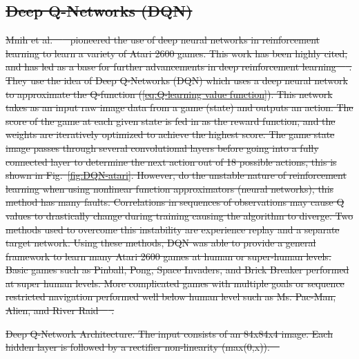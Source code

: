 \documentclass[12pt,american]{report}
\providecommand{\DIFdeltex}[1]{{\protect\color{red}\sout{#1}}}                      %
\providecommand{\DIFdelFL}[1]{\DIFdel{#1}} %
\providecommand{\DIFdel}[1]{\texorpdfstring{\DIFdeltex{#1}}{}} %
\begin{document}
\subsection{\DIFdel{Deep Q-Networks (DQN)}}
\addtocounter{subsection}{-1}%
\DIFdel{Mnih et al.~\mbox{%
\cite{atari} }%
pioneered the use of deep neural networks in reinforcement learning to learn a variety of Atari 2600 games.  This work has been highly cited, and has led as a base for further advancements in deep reinforcement learning~\mbox{%
\cite{atari}}%
.  They use the idea of Deep Q-Networks (DQN) which uses a deep neural network to approximate the Q-function (\ref{eq:Q-learning value function}). This network takes as an input raw image data from a game (state) and outputs an action. The score of the game at each given state is fed in as the reward function, and the weights are iteratively optimized to achieve the highest score. The game state image passes through several convolutional layers before going into a fully connected layer to determine the next action out of 18 possible actions, this is shown in Fig.~\ref{fig:DQN-atari}. However, do the unstable nature of reinforcement learning when using nonlinear function approximators (neural networks), this method has many faults. Correlations in sequences of observations may cause Q values to drastically change during training causing the algorithm to diverge. Two methods used to overcome this instability are experience replay and a separate target network. Using these methods, DQN was able to provide a general framework to learn many Atari 2600 games at human or super-human levels. Basic games such as Pinball, Pong, Space Invaders, and Brick Breaker performed at super human levels. More complicated games with multiple goals or sequence restricted navigation performed well below human level such as Ms. Pac-Man, Alien, and River Raid~\mbox{%
\cite{atari}}%
.
}%

{%
\DIFdelFL{Deep Q-Network Architecture. The input consists of an 84x84x4 image. Each hidden layer is followed by a rectifier non-linearity (max(0,x)).~\mbox{%
\cite{atari}}%
}}
\end{document}
